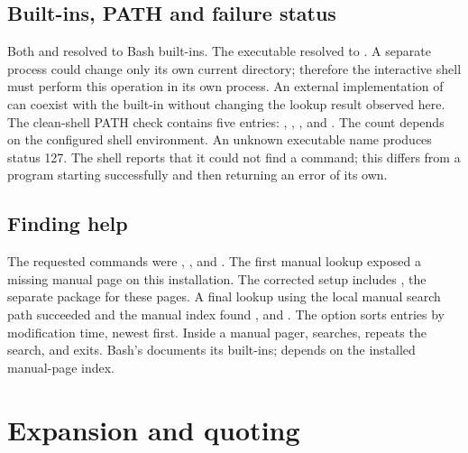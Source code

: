 \documentclass{../latex/utmreport}
\begin{document}
\section{Built-ins, PATH and failure status}
Both  and  resolved to Bash built-ins. The  executable
resolved to . A separate  process could change only its
own current directory; therefore the interactive shell must perform this operation
in its own process. An external implementation of  can coexist with the
built-in without changing the lookup result observed here.
The clean-shell PATH check contains five entries: ,
, ,  and .
The count depends on the configured shell environment.
An unknown executable name produces status 127. The shell reports that it could
not find a command; this differs from a program starting successfully and then
returning an error of its own.

\section{Finding help}
The requested commands were , ,
 and . The first manual lookup
exposed a missing  manual page on this installation. The corrected setup
includes , the separate package for these pages. A final
lookup using the local manual search path succeeded and the manual index found
,  and . The option
 sorts entries by modification time, newest first. Inside a manual pager,
 searches,  repeats the search, and  exits.
Bash's  documents its built-ins;  depends on the installed
manual-page index.

\chapter{Expansion and quoting}
\end{document}
